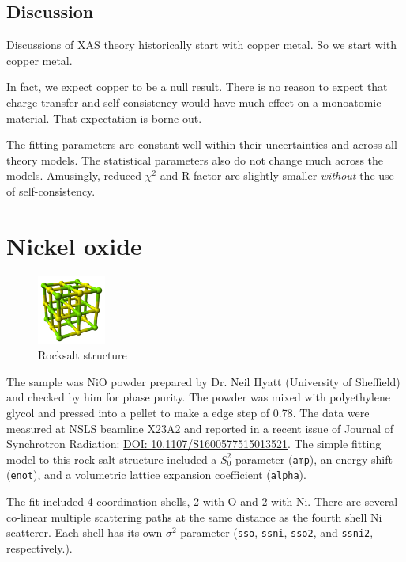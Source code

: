 \documentclass[11pt]{article}
\begin{document}
\subsection{Discussion}
\label{sec:orgheadline6}

Discussions of XAS theory historically start with copper metal.  So we
start with copper metal.

In fact, we expect copper to be a null result. There is no reason to
expect that charge transfer and self-consistency would have much effect
on a monoatomic material. That expectation is borne out.

The fitting parameters are constant well within their uncertainties
and across all theory models. The statistical parameters also do not
change much across the models. Amusingly, reduced $\chi^2$ and
R-factor are slightly smaller \emph{without} the use of
self-consistency.


\section{Nickel oxide}
\label{sec:orgheadline13}

\begin{figure}
  \begin{center}
    \includegraphics[width=0.2\textwidth]{NiO/NiO.png}
  \end{center}
  \caption{Rocksalt structure}
\end{figure}


The sample was NiO powder prepared by Dr. Neil Hyatt (University of
Sheffield) and checked by him for phase purity. The powder was mixed
with polyethylene glycol and pressed into a pellet to make a edge step
of 0.78. The data were measured at NSLS beamline X23A2 and reported in
a recent issue of Journal of Synchrotron Radiation:
\href{http://dx.doi.org/10.1107/S1600577515013521}{DOI:
  10.1107/S1600577515013521}. The simple fitting model to this rock
salt structure included a $S_0^2$ parameter (\texttt{amp}), an energy
shift (\texttt{enot}), and a volumetric lattice expansion coefficient
(\texttt{alpha}).

The fit included 4 coordination shells, 2 with O and 2 with Ni. There
are several co-linear multiple scattering paths at the same distance
as the fourth shell Ni scatterer. Each shell has its own $\sigma^2$
parameter (\texttt{sso}, \texttt{ssni}, \texttt{sso2}, and
\texttt{ssni2}, respectively.).
\end{document}
